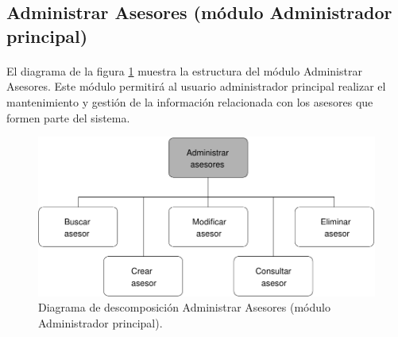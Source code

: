 \subsection{Administrar Asesores (módulo Administrador principal)}

  \paragraph{}El diagrama de la figura
  \ref{diagramaDescomposicionAdministrarAsesores} muestra la estructura del
  módulo Administrar Asesores. Este módulo permitirá al usuario administrador
  principal realizar el mantenimiento y gestión de la información relacionada
  con los asesores que formen parte del sistema.

  \begin{figure}[!ht]
    \begin{center}
      \includegraphics[]{11.Disenyo_Arquitectonico/11.2.Diagramas_Descomposicion/11.2.2.Modulo_administrador_principal/AdministrarBBDD/AdministrarUsuarios/AdministrarAsesores/Diagramas/administrar_asesores.pdf}
      \caption{Diagrama de descomposición Administrar Asesores (módulo Administrador principal).}
      \label{diagramaDescomposicionAdministrarAsesores}
    \end{center}
  \end{figure}
